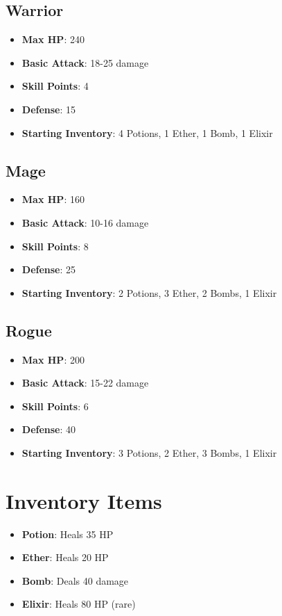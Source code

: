 \documentclass[12pt]{article}
\begin{document}
\subsection{Warrior}
\begin{itemize}
    \item \textbf{Max HP}: 240
    \item \textbf{Basic Attack}: 18-25 damage
    \item \textbf{Skill Points}: 4
    \item \textbf{Defense}: 15
    \item \textbf{Starting Inventory}: 4 Potions, 1 Ether, 1 Bomb, 1 Elixir
\end{itemize}

\subsection{Mage}
\begin{itemize}
    \item \textbf{Max HP}: 160
    \item \textbf{Basic Attack}: 10-16 damage
    \item \textbf{Skill Points}: 8
    \item \textbf{Defense}: 25
    \item \textbf{Starting Inventory}: 2 Potions, 3 Ether, 2 Bombs, 1 Elixir
\end{itemize}

\subsection{Rogue}
\begin{itemize}
    \item \textbf{Max HP}: 200
    \item \textbf{Basic Attack}: 15-22 damage
    \item \textbf{Skill Points}: 6
    \item \textbf{Defense}: 40
    \item \textbf{Starting Inventory}: 3 Potions, 2 Ether, 3 Bombs, 1 Elixir
\end{itemize}

\section{Inventory Items}
\label{sec:inventory}

\begin{itemize}
    \item \textbf{Potion}: Heals 35 HP
    \item \textbf{Ether}: Heals 20 HP
    \item \textbf{Bomb}: Deals 40 damage
    \item \textbf{Elixir}: Heals 80 HP (rare)
\end{itemize}
\end{document}
